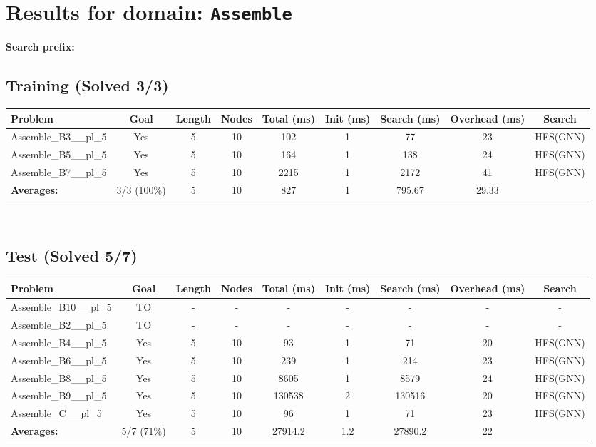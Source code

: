 \documentclass{article}
\begin{document}
\section*{Results for domain: \texttt{Assemble}}
\textbf{Search prefix:} 
\\[0.5cm]
\subsection*{Training (Solved 3/3)}
\begin{tabular}{lcccccccc}
\toprule
Problem & Goal & Length & Nodes & Total (ms) & Init (ms) & Search (ms) & Overhead (ms) & Search \\
\midrule
Assemble\_B3\_\_pl\_5 & Yes & 5 & 10 & 102 & 1 & 77 & 23 & HFS(GNN) \\
Assemble\_B5\_\_pl\_5 & Yes & 5 & 10 & 164 & 1 & 138 & 24 & HFS(GNN) \\
Assemble\_B7\_\_pl\_5 & Yes & 5 & 10 & 2215 & 1 & 2172 & 41 & HFS(GNN) \\
\textbf{Averages:} & 3/3 (100\%) & 5 & 10 & 827 & 1 & 795.67 & 29.33 & \\
\bottomrule
\end{tabular}
\\[0.7cm]
\subsection*{Test (Solved 5/7)}
\begin{tabular}{lcccccccc}
\toprule
Problem & Goal & Length & Nodes & Total (ms) & Init (ms) & Search (ms) & Overhead (ms) & Search \\
\midrule
Assemble\_B10\_\_pl\_5 & TO & - & - & - & - & - & - & - \\
Assemble\_B2\_\_pl\_5 & TO & - & - & - & - & - & - & - \\
Assemble\_B4\_\_pl\_5 & Yes & 5 & 10 & 93 & 1 & 71 & 20 & HFS(GNN) \\
Assemble\_B6\_\_pl\_5 & Yes & 5 & 10 & 239 & 1 & 214 & 23 & HFS(GNN) \\
Assemble\_B8\_\_pl\_5 & Yes & 5 & 10 & 8605 & 1 & 8579 & 24 & HFS(GNN) \\
Assemble\_B9\_\_pl\_5 & Yes & 5 & 10 & 130538 & 2 & 130516 & 20 & HFS(GNN) \\
Assemble\_C\_\_pl\_5 & Yes & 5 & 10 & 96 & 1 & 71 & 23 & HFS(GNN) \\
\textbf{Averages:} & 5/7 (71\%) & 5 & 10 & 27914.2 & 1.2 & 27890.2 & 22 & \\
\bottomrule
\end{tabular}
\\[0.7cm]
\end{document}
